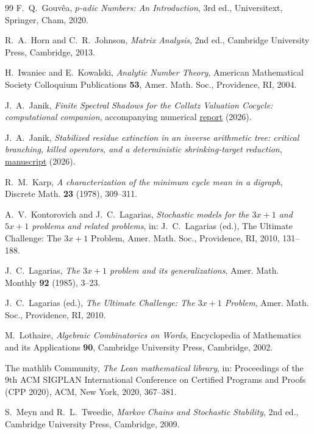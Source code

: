 \documentclass[11pt]{article}
\theoremstyle{plain}
\theoremstyle{definition}
\theoremstyle{remark}
\begin{document}
\begin{thebibliography}{99}
 F.~Q.~Gouv\^ea, \emph{$p$-adic Numbers: An Introduction},
3rd ed., Universitext, Springer, Cham, 2020.

 R.~A.~Horn and C.~R.~Johnson, \emph{Matrix Analysis},
2nd ed., Cambridge University Press, Cambridge, 2013.

 H.~Iwaniec and E.~Kowalski, \emph{Analytic Number
Theory}, American Mathematical Society Colloquium Publications \textbf{53},
Amer. Math. Soc., Providence, RI, 2004.

 J.~A.~Janik, \emph{Finite Spectral Shadows for the Collatz
Valuation Cocycle: computational companion}, accompanying numerical \href{https://github.com/johnjanik/syracuse-confinement/tree/main/deterministic_equidistribution_theory}{report} (2026).

 J.~A.~Janik, \emph{Stabilized residue extinction in an inverse
arithmetic tree: critical branching, killed operators, and a deterministic
shrinking-target reduction}, \href{https://github.com/johnjanik/syracuse-confinement/tree/main/deterministic_equidistribution_theory}{manuscript} (2026).

 R.~M.~Karp, \emph{A characterization of the minimum cycle
mean in a digraph}, Discrete Math. \textbf{23} (1978), 309--311.

 A.~V.~Kontorovich and J.~C.~Lagarias,
\emph{Stochastic models for the $3x+1$ and $5x+1$ problems and related
problems}, in: J.~C.~Lagarias (ed.), The Ultimate Challenge: The $3x+1$
Problem, Amer. Math. Soc., Providence, RI, 2010, 131--188.

 J.~C.~Lagarias, \emph{The $3x+1$ problem and its
generalizations}, Amer. Math. Monthly \textbf{92} (1985), 3--23.

 J.~C.~Lagarias (ed.), \emph{The Ultimate Challenge: The
$3x+1$ Problem}, Amer. Math. Soc., Providence, RI, 2010.

 M.~Lothaire, \emph{Algebraic Combinatorics on Words},
Encyclopedia of Mathematics and its Applications \textbf{90}, Cambridge
University Press, Cambridge, 2002.

 The mathlib Community, \emph{The Lean mathematical
library}, in: Proceedings of the 9th ACM SIGPLAN International Conference on
Certified Programs and Proofs (CPP 2020), ACM, New York, 2020, 367--381.

 S.~Meyn and R.~L.~Tweedie, \emph{Markov Chains and
Stochastic Stability}, 2nd ed., Cambridge University Press, Cambridge, 2009.


\end{thebibliography}
\end{document}
